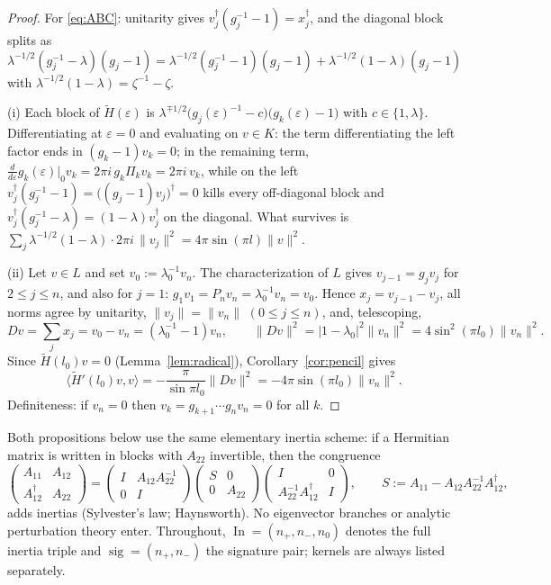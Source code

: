 \documentclass[11pt]{article}
\theoremstyle{definition}
\newcommand{\Ht}{\widetilde H}
\newcommand{\sig}{\operatorname{sig}}
\begin{document}
\begin{proof}
For \eqref{eq:ABC}: unitarity gives
$v_j^{\dagger}(g_j^{-1}-1)=x_j^{\dagger}$, and the diagonal block
splits as
$\lambda^{-1/2}(g_j^{-1}-\lambda)(g_j-1)
=\lambda^{-1/2}(g_j^{-1}-1)(g_j-1)+\lambda^{-1/2}(1-\lambda)(g_j-1)$
with $\lambda^{-1/2}(1-\lambda)=\zeta^{-1}-\zeta$.

(i) Each block of $\Ht(\varepsilon)$ is
$\lambda^{\mp1/2}\bigl(g_j(\varepsilon)^{-1}-c\bigr)\bigl(g_k(\varepsilon)-1\bigr)$
with $c\in\{1,\lambda\}$. Differentiating at $\varepsilon=0$ and
evaluating on $v\in K$: the term differentiating the left factor ends
in $(g_k-1)v_k=0$; in the remaining term,
$\tfrac{d}{d\varepsilon}g_k(\varepsilon)\big|_0v_k
=2\pi i\,g_k\Pi_kv_k=2\pi i\,v_k$, while on the left
$v_j^{\dagger}(g_j^{-1}-1)=\bigl((g_j-1)v_j\bigr)^{\dagger}=0$ kills
every off-diagonal block and
$v_j^{\dagger}(g_j^{-1}-\lambda)=(1-\lambda)v_j^{\dagger}$ on the
diagonal. What survives is
$\sum_j\lambda^{-1/2}(1-\lambda)\cdot2\pi i\,\lVert v_j\rVert^{2}
=4\pi\sin(\pi l)\lVert v\rVert^{2}$.

(ii) Let $v\in L$ and set $v_0:=\lambda_0^{-1}v_n$. The
characterization of $L$ gives $v_{j-1}=g_jv_j$ for $2\le j\le n$, and
also for $j=1$: $g_1v_1=P_nv_n=\lambda_0^{-1}v_n=v_0$. Hence
$x_j=v_{j-1}-v_j$, all norms agree by unitarity,
$\lVert v_j\rVert=\lVert v_n\rVert$ $(0\le j\le n)$, and, telescoping,
\[
Dv=\sum_jx_j=v_0-v_n=(\lambda_0^{-1}-1)v_n,
\qquad
\lVert Dv\rVert^{2}=\lvert1-\lambda_0\rvert^{2}\lVert v_n\rVert^{2}
=4\sin^{2}(\pi l_0)\lVert v_n\rVert^{2}.
\]
Since $\Ht(l_0)v=0$ (Lemma~\ref{lem:radical}),
Corollary~\ref{cor:pencil} gives
\[
\langle\Ht'(l_0)v,v\rangle=-\frac{\pi}{\sin\pi l_0}\lVert Dv\rVert^{2}
=-4\pi\sin(\pi l_0)\lVert v_n\rVert^{2}.
\]
Definiteness: if $v_n=0$ then $v_k=g_{k+1}\cdots g_nv_n=0$ for all
$k$.
\end{proof}

Both propositions below use the same elementary inertia scheme: if a
Hermitian matrix is written in blocks with $A_{22}$ invertible, then
the congruence
\begin{equation}\label{eq:haynsworth}
\begin{pmatrix}A_{11}&A_{12}\\ A_{12}^{\dagger}&A_{22}\end{pmatrix}
=\begin{pmatrix}I&A_{12}A_{22}^{-1}\\ 0&I\end{pmatrix}
\begin{pmatrix}S&0\\ 0&A_{22}\end{pmatrix}
\begin{pmatrix}I&0\\ A_{22}^{-1}A_{12}^{\dagger}&I\end{pmatrix},
\qquad
S:=A_{11}-A_{12}A_{22}^{-1}A_{12}^{\dagger},
\end{equation}
adds inertias (Sylvester's law; Haynsworth). No eigenvector branches or
analytic perturbation theory enter. Throughout,
$\operatorname{In}=(n_+,n_-,n_0)$ denotes the full inertia triple and
$\sig=(n_+,n_-)$ the signature pair; kernels are always listed
separately.
\end{document}
